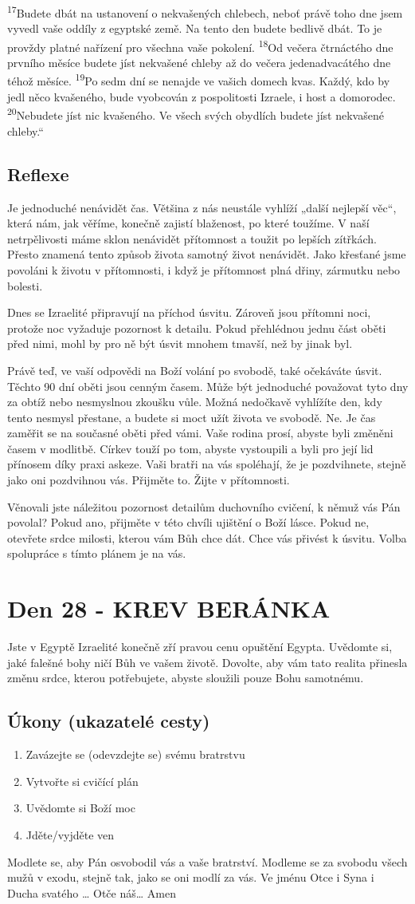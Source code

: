 \documentclass[11pt]{article}
\newcommand{\zacatekCtvrtyTyden}{
  Jste v Egyptě \newline
  Izraelité konečně zří pravou cenu opuštění Egypta. Uvědomte si, jaké falešné bohy ničí Bůh ve vašem životě.
Dovolte, aby vám tato realita přinesla změnu srdce, kterou potřebujete, abyste sloužili pouze Bohu samotnému.

\subsection*{Úkony (ukazatelé cesty)}
\begin{enumerate}
  \item Zavázejte se (odevzdejte se) svému bratrstvu
  \item Vytvořte si cvičící plán
  \item Uvědomte si Boží moc
  \item Jděte/vyjděte ven
\end{enumerate}
Modlete se, aby Pán osvobodil vás a vaše bratrství. \newline
Modleme se za svobodu všech mužů v exodu, stejně tak, jako se oni modlí za vás.\newline
Ve jménu Otce i Syna i Ducha svatého …  Otče náš… Amen
}
\begin{document}
{\textsuperscript{17}Budete dbát na ustanovení o nekvašených chlebech, neboť právě toho dne jsem vyvedl vaše oddíly z egyptské země. Na tento den budete bedlivě dbát. To je provždy platné nařízení pro všechna vaše pokolení.
\textsuperscript{18}Od večera čtrnáctého dne prvního měsíce budete jíst nekvašené chleby až do večera jedenadvacátého dne téhož měsíce.
\textsuperscript{19}Po sedm dní se nenajde ve vašich domech kvas. Každý, kdo by jedl něco kvašeného, bude vyobcován z pospolitosti Izraele, i host a domorodec.
\textsuperscript{20}Nebudete jíst nic kvašeného. Ve všech svých obydlích budete jíst nekvašené chleby.“
}

\subsection*{Reflexe}
Je jednoduché nenávidět čas. Většina z nás neustále vyhlíží „další nejlepší věc“, která nám, jak věříme, konečně zajistí
blaženost, po které toužíme. V naší netrpělivosti máme sklon nenávidět přítomnost a toužit po lepších zítřkách. Přesto znamená
tento způsob života samotný život nenávidět. Jako křesťané jsme povoláni k životu v přítomnosti, i když je přítomnost plná
dřiny, zármutku nebo bolesti.

Dnes se Izraelité připravují na příchod úsvitu. Zároveň jsou přítomni noci, protože noc vyžaduje pozornost k detailu. Pokud
přehlédnou jednu část oběti před nimi, mohl by pro ně být úsvit mnohem tmavší, než by jinak byl.

Právě teď, ve vaší odpovědi na Boží volání po svobodě, také očekáváte úsvit. Těchto 90 dní oběti jsou cenným časem. Může
být jednoduché považovat tyto dny za obtíž nebo nesmyslnou zkoušku vůle. Možná nedočkavě vyhlížíte den, kdy tento
nesmysl přestane, a budete si moct užít života ve svobodě. Ne. Je čas zaměřit se na současné oběti před vámi. Vaše rodina
prosí, abyste byli změněni časem v modlitbě. Církev touží po tom, abyste vystoupili a byli pro její lid přínosem díky praxi
askeze. Vaši bratři na vás spoléhají, že je pozdvihnete, stejně jako oni pozdvihnou vás. Přijměte to. Žijte v přítomnosti.

Věnovali jste náležitou pozornost detailům duchovního cvičení, k němuž vás Pán povolal? Pokud ano, přijměte v této chvíli
ujištění o Boží lásce. Pokud ne, otevřete srdce milosti, kterou vám Bůh chce dát. Chce vás přivést k úsvitu. Volba spolupráce
s tímto plánem je na vás.

\newpage
\section{Den 28 - KREV BERÁNKA}
\zacatekCtvrtyTyden
\end{document}

